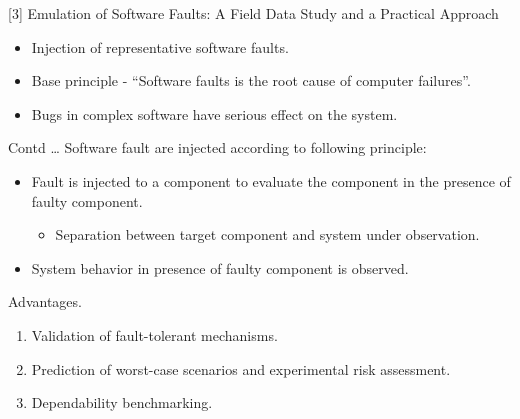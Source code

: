 \documentclass[xcolor=x11names,compress]{beamer}
\renewcommand{\(}{\begin{columns}}
\renewcommand{\)}{\end{columns}}
\newcommand{\<}[1]{\begin{column}{#1}}
\renewcommand{\>}{\end{column}}
\begin{document}
\begin{frame}{ [3] Emulation of Software Faults: A Field Data Study and	a Practical Approach}
	\begin{itemize}
		\item Injection of representative software faults.
		\newline
		\item Base principle - ``Software faults is the root cause of computer failures''.
		\newline
		\item Bugs in complex software have serious effect on the system.
		
	\end{itemize}
\end{frame}
\begin{frame}{Contd \dots}
	Software
	fault are injected according to following principle:
	
	\begin{itemize}
		\item Fault is injected to a component to evaluate the component in the presence of faulty component.
		
		\begin{itemize}
			\item Separation between target component and system under observation.
			
		\end{itemize}
		\item System behavior in presence of faulty component is observed.\newline
	\end{itemize}
	
	\begin{block}{Advantages.}
	\begin{enumerate}
		\item Validation of fault-tolerant mechanisms.
		\item  Prediction of worst-case scenarios and experimental risk assessment.
		\item  Dependability benchmarking.
	\end{enumerate}
	\end{block}
\end{frame}
\end{document}

